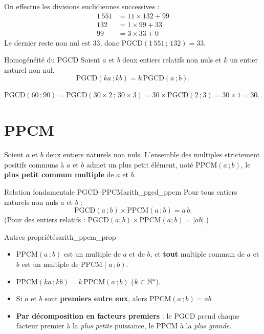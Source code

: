 \solution

On effectue les divisions euclidiennes successives :
$$
\begin{aligned}
	1\,551 &= 11 \times 132 + 99\\
	   132 &= 1 \times 99 + 33\\
	    99 &= 3 \times 33 + 0
\end{aligned}
$$
Le dernier reste non nul est $33$, donc $\mathrm{PGCD}(1\,551\,;\,132) = 33$.

\begin{propriete}{Homogénéité du PGCD}{}
	Soient $a$ et $b$ deux entiers relatifs non nuls et $k$ un entier naturel non nul.
	$$
	\mathrm{PGCD}(ka\,;kb) = k\,\mathrm{PGCD}(a\,;b).
	$$
\end{propriete}

\begin{exemple}
	$\mathrm{PGCD}(60\,;90) = \mathrm{PGCD}(30 \times 2\,;\,30 \times 3)
	= 30 \times \mathrm{PGCD}(2\,;3) = 30 \times 1 = 30$.
\end{exemple}


\section{PPCM}

\begin{definition}
	Soient $a$ et $b$ deux entiers naturels non nuls. L'ensemble des multiples
	strictement positifs communs à $a$ et $b$ admet un plus petit élément, noté
	$\mathrm{PPCM}(a\,;b)$, le \textbf{plus petit commun multiple} de $a$ et $b$.
\end{definition}

\begin{propriete}{Relation fondamentale PGCD–PPCM}{arith_pgcd_ppcm}
	Pour tous entiers naturels non nuls $a$ et $b$ :
	$$
	\mathrm{PGCD}(a\,;b) \times \mathrm{PPCM}(a\,;b) = a\,b.
	$$
	(Pour des entiers relatifs : $\mathrm{PGCD}(a;b)\times\mathrm{PPCM}(a;b) = |ab|$.)
\end{propriete}

\begin{propriete}{Autres propriétés}{arith_ppcm_prop}
	\begin{itemize}[label=\textbullet]
		\item $\mathrm{PPCM}(a\,;b)$ est un multiple de $a$ et de $b$, et
		\textbf{tout} multiple commun de $a$ et $b$ est un multiple de
		$\mathrm{PPCM}(a\,;b)$.
		\item $\mathrm{PPCM}(ka\,;kb) = k\,\mathrm{PPCM}(a\,;b)$ \quad ($k \in \mathbb{N}^*$).
		\item Si $a$ et $b$ sont \textbf{premiers entre eux}, alors
		$\mathrm{PPCM}(a\,;b) = ab$.
		\item \textbf{Par décomposition en facteurs premiers} : le PGCD prend
		chaque facteur premier à la \emph{plus petite} puissance, le PPCM à la
		\emph{plus grande}.
	\end{itemize}
\end{propriete}

